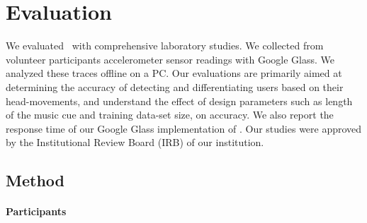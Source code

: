 \section{Evaluation}\label{sec:results}

We evaluated \systemname~with comprehensive laboratory studies.
We collected from volunteer participants accelerometer sensor readings with Google Glass.
We analyzed these traces offline on a PC.
Our evaluations are primarily aimed at determining the accuracy of detecting 
and differentiating users based on their head-movements, and understand 
the effect of design parameters such as length of the music cue and training 
data-set size, on accuracy. We also report the response time of our Google 
Glass implementation of \systemname.
Our studies were approved by the Institutional Review Board (IRB) of our 
institution.

\subsection{Method}



\paragraph{Participants}

